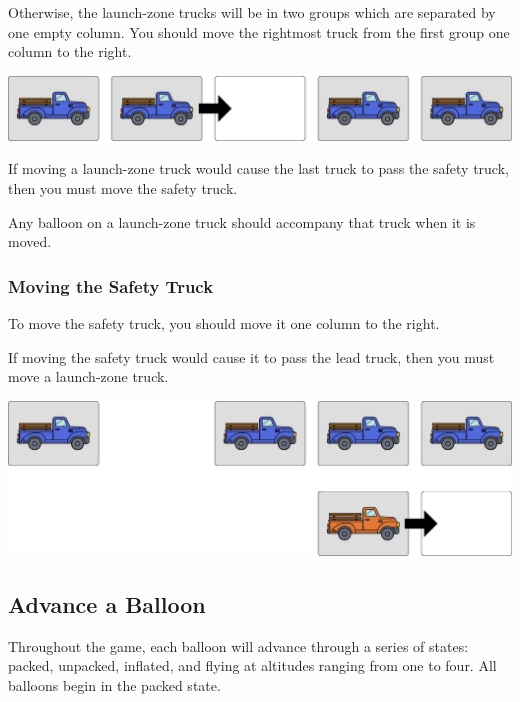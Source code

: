 \documentclass[a6paper, 11pt, parskip=half, DIV=15]{scrartcl}
\begin{document}

Otherwise, the launch-zone trucks will be in two groups which are separated by one empty column. You should move the rightmost truck from the first group one column to the right.

\begin{center}
\includegraphics[scale=0.1]{wind_diagram_2.jpg}
\end{center}

If moving a launch-zone truck would cause the last truck to pass the safety truck, then you must move the safety truck.

Any balloon on a launch-zone truck should accompany that truck when it is moved.

\newpage
\enlargethispage{1.75\baselineskip}
\subsubsection*{Moving the Safety Truck}
To move the safety truck, you should move it one column to the right.

If moving the safety truck would cause it to pass the lead truck, then you must move a launch-zone truck.

\begin{center}
\includegraphics[scale=0.1]{wind_diagram_3.jpg}
\end{center}

\subsection*{Advance a Balloon}
Throughout the game, each balloon will advance through a series of states: packed, unpacked, inflated, and flying at altitudes ranging from one to four. All balloons begin in the packed state.
\end{document}
